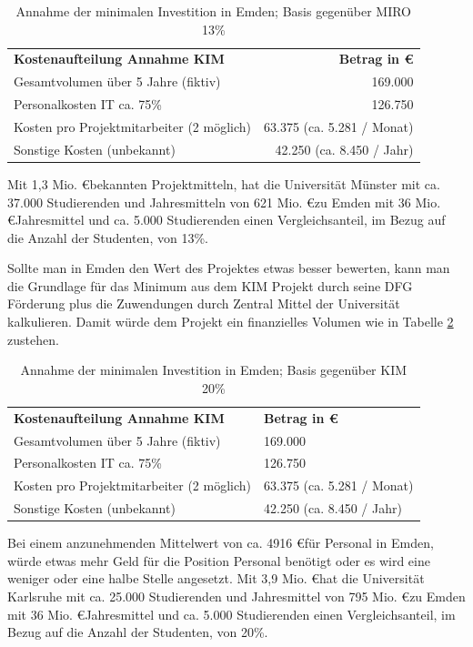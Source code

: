 \begin{table}[h!]
	\begin{tabularx}{\textwidth}{l|r}
		\hline
		\textbf{Kostenaufteilung Annahme KIM} & \textbf{Betrag in \euro}\\
		Gesamtvolumen über 5 Jahre (fiktiv) & 169.000\\
		Personalkosten IT ca. 75\% & 126.750\\
		Kosten pro Projektmitarbeiter (2 möglich) & 63.375 (ca. 5.281 / Monat)\\ 
		Sonstige Kosten (unbekannt) & 42.250 (ca. 8.450 / Jahr)\\
		\hline
	\end{tabularx}
	\caption{Annahme der minimalen Investition in Emden; Basis gegenüber MIRO 13\%}
	\label{tab_kostenaufteilung_emden_MIRO}
\end{table}

Mit 1,3 Mio. \euro bekannten Projektmitteln, hat die Universität Münster mit ca. 37.000 Studierenden und Jahresmitteln von 621 Mio. \euro zu Emden mit 36 Mio. \euro Jahresmittel und ca. 5.000 Studierenden einen Vergleichsanteil, im Bezug auf die Anzahl der Studenten, von 13\%.

Sollte man in Emden den Wert des Projektes etwas besser bewerten, kann man die Grundlage für das Minimum aus dem KIM Projekt durch seine DFG Förderung plus die Zuwendungen durch Zentral Mittel der Universität kalkulieren. Damit würde dem Projekt ein finanzielles Volumen wie in Tabelle \ref{tab_kostenaufteilung_emden_KIM} zustehen.

\begin{table}[h!]
	\begin{tabularx}{\textwidth}{l|X}
		\hline
		\textbf{Kostenaufteilung Annahme KIM} & \textbf{Betrag in \euro}\\
		Gesamtvolumen über 5 Jahre (fiktiv) & 169.000\\
		Personalkosten IT ca. 75\% & 126.750\\
		Kosten pro Projektmitarbeiter (2 möglich) & 63.375 (ca. 5.281 / Monat)\\ 
		Sonstige Kosten (unbekannt) & 42.250 (ca. 8.450 / Jahr)\\
		\hline
	\end{tabularx}
	\caption{Annahme der minimalen Investition in Emden; Basis gegenüber KIM 20\%}
	\label{tab_kostenaufteilung_emden_KIM}
\end{table}

Bei einem anzunehmenden Mittelwert von ca. 4916 \euro für Personal in Emden, würde etwas mehr Geld für die Position Personal benötigt oder es wird eine weniger oder eine halbe Stelle angesetzt. Mit 3,9 Mio. \euro hat die Universität Karlsruhe mit ca. 25.000 Studierenden und Jahresmittel von 795 Mio. \euro zu Emden mit 36 Mio. \euro Jahresmittel und ca. 5.000 Studierenden einen Vergleichsanteil, im Bezug auf die Anzahl der Studenten, von 20\%.